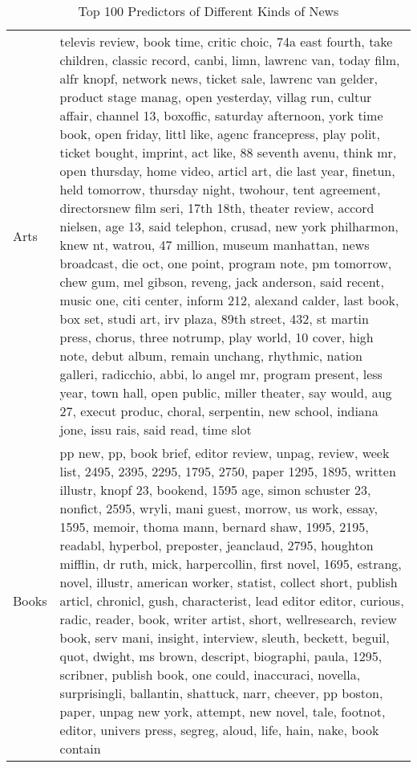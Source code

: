 \begingroup\tiny
\begin{longtable}{p{}p{}}
\caption{Top 100 Predictors of Different Kinds of News} \label{tab:top100_predictors}
 \\ 
  \hline
  \hline
Arts & televis review, book time, critic choic, 74a east fourth, take children, classic record, canbi, limn, lawrenc van, today film, alfr knopf, network news, ticket sale, lawrenc van gelder, product stage manag, open yesterday, villag run, cultur affair, channel 13, boxoffic, saturday afternoon, york time book, open friday, littl like, agenc francepress, play polit, ticket bought, imprint, act like, 88 seventh avenu, think mr, open thursday, home video, articl art, die last year, finetun, held tomorrow, thursday night, twohour, tent agreement, directorsnew film seri, 17th 18th, theater review, accord nielsen, age 13, said telephon, crusad, new york philharmon, knew nt, watrou, 47 million, museum manhattan, news broadcast, die oct, one point, program note, pm tomorrow, chew gum, mel gibson, reveng, jack anderson, said recent, music one, citi center, inform 212, alexand calder, last book, box set, studi art, irv plaza, 89th street, 432, st martin press, chorus, three notrump, play world, 10 cover, high note, debut album, remain unchang, rhythmic, nation galleri, radicchio, abbi, lo angel mr, program present, less year, town hall, open public, miller theater, say would, aug 27, execut produc, choral, serpentin, new school, indiana jone, issu rais, said read, time slot \\ 
  Books & pp new, pp, book brief, editor review, unpag, review, week list, 2495, 2395, 2295, 1795, 2750, paper 1295, 1895, written illustr, knopf 23, bookend, 1595 age, simon schuster 23, nonfict, 2595, wryli, mani guest, morrow, us work, essay, 1595, memoir, thoma mann, bernard shaw, 1995, 2195, readabl, hyperbol, preposter, jeanclaud, 2795, houghton mifflin, dr ruth, mick, harpercollin, first novel, 1695, estrang, novel, illustr, american worker, statist, collect short, publish articl, chronicl, gush, characterist, lead editor editor, curious, radic, reader, book, writer artist, short, wellresearch, review book, serv mani, insight, interview, sleuth, beckett, beguil, quot, dwight, ms brown, descript, biographi, paula, 1295, scribner, publish book, one could, inaccuraci, novella, surprisingli, ballantin, shattuck, narr, cheever, pp boston, paper, unpag new york, attempt, new novel, tale, footnot, editor, univers press, segreg, aloud, life, hain, nake, book contain \\ 

\end{longtable}
